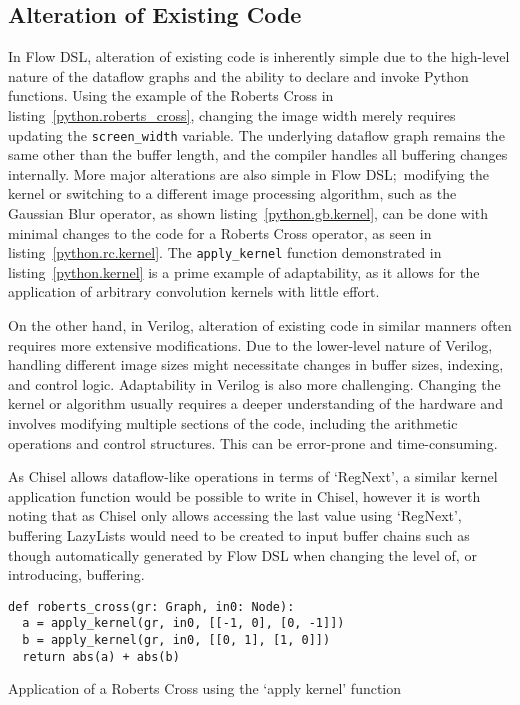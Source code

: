 \subsection{Alteration of Existing Code}
In Flow DSL, alteration of existing code is inherently simple due to the high-level nature of the dataflow graphs and the ability to declare and invoke Python functions. Using the example of the Roberts Cross in listing \ref{python.roberts_cross}, changing the image width merely requires updating the \lstinline|screen_width| variable. The underlying dataflow graph remains the same other than the buffer length, and the compiler handles all buffering changes internally. More major alterations are also simple in Flow DSL; modifying the kernel or switching to a different image processing algorithm, such as the Gaussian Blur operator, as shown listing \ref{python.gb.kernel}, can be done with minimal changes to the code for a Roberts Cross operator, as seen in listing \ref{python.rc.kernel}. The \lstinline|apply_kernel| function demonstrated in listing \ref{python.kernel} is a prime example of adaptability, as it allows for the application of arbitrary convolution kernels with little effort.

On the other hand, in Verilog, alteration of existing code in similar manners often requires more extensive modifications. Due to the lower-level nature of Verilog, handling different image sizes might necessitate changes in buffer sizes, indexing, and control logic. Adaptability in Verilog is also more challenging. Changing the kernel or algorithm usually requires a deeper understanding of the hardware and involves modifying multiple sections of the code, including the arithmetic operations and control structures. This can be error-prone and time-consuming.

As Chisel allows dataflow-like operations in terms of `RegNext', a similar kernel application function would be possible to write in Chisel, however it is worth noting that as Chisel only allows accessing the last value using `RegNext', buffering LazyLists would need to be created to input buffer chains such as though automatically generated by Flow DSL when changing the level of, or introducing, buffering.

\begin{listing}[H]
  \begin{verbatim}
def roberts_cross(gr: Graph, in0: Node):
  a = apply_kernel(gr, in0, [[-1, 0], [0, -1]])
  b = apply_kernel(gr, in0, [[0, 1], [1, 0]])
  return abs(a) + abs(b)
  \end{verbatim}
  \caption{Application of a Roberts Cross using the `apply kernel' function}\label{python.rc.kernel}
\end{listing}

